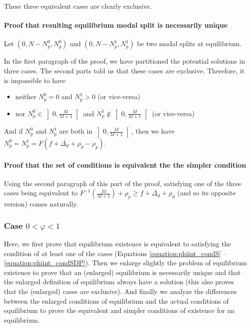 \documentclass[english, a4paper]{article}
\theoremstyle{plain}
\theoremstyle{definition}
\theoremstyle{remark}
\begin{document}
These three equivalent cases are clearly exclusive.

\paragraph{Proof that resulting equilibrium modal split is necessarily unique}

Let $(0, N - N_p^0, N_p^0)$ and $(0, N - N_p^1, N_p^1)$ be two modal splits at equilibrium.

In the first paragraph of the proof, we have partitioned the potential solutions in three cases. The second parts told us that these cases are exclusive. Therefore, it is impossible to have
\begin{itemize}
    \item neither $N_p^0 = 0$ and $N_p^1 > 0$ (or vice-versa)
    \item nor $N_p^0 \in \left] 0, \frac{M}{M + 1} \right[$ and $N_p^1 \notin \left] 0, \frac{M}{M + 1} \right[$ (or vice-versa)
\end{itemize}

And if $N_p^0$ and $N_p^1$ are both in $\left] 0, \frac{M}{M + 1} \right[$, then we have $N_p^0 = N_p^1 = F(f + \overline{\Delta_d} + \rho_d - \rho_p)$.



\paragraph{Proof that the set of conditions is equivalent the the simpler condition}

Using the second paragraph of this part of the proof, satisfying one of the three cases being equivalent to $F^{-1}\left(\frac{M}{M + 1}\right) + \rho_p \geq f + \overline{\Delta_d} + \rho_d$ (and so its opposite version) comes naturally.

\subsubsection{Case \texorpdfstring{$0 < \varphi < 1$}{0 < phi < 1}}

Here, we first prove that equilibrium existence is equivalent to satisfying the condition of at least one of the cases (Equations \ref{equation:phiint_condS} -- \ref{equation:phiint_condSDP}). Then we enlarge slightly the problem of equilibrium existence to prove that an (enlarged) equilibrium is necessarily unique and that the enlarged definition of equilibrium always have a solution (this also proves that the (enlarged) cases are exclusive). And finally we analyze the differences between the enlarged conditions of equilibrium and the actual conditions of equilibrium to prove the equivalent and simpler conditions of existence for an equilibrium.
\end{document}

